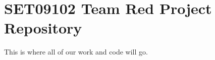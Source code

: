 \chapter{SET09102 Team Red Project Repository}
\hypertarget{md__c_1_2_users_2otfri_2_documents_2_s_e_b_2_s_e_b5___napier_2_s_e_t09102___software___engineeri976c4518b45f5fc51b6b43f6c21d02dc}{}\label{md__c_1_2_users_2otfri_2_documents_2_s_e_b_2_s_e_b5___napier_2_s_e_t09102___software___engineeri976c4518b45f5fc51b6b43f6c21d02dc}
\label{md__c_1_2_users_2otfri_2_documents_2_s_e_b_2_s_e_b5___napier_2_s_e_t09102___software___engineeri976c4518b45f5fc51b6b43f6c21d02dc_autotoc_md0}%
%
 This is where all of our work and code will go. 
